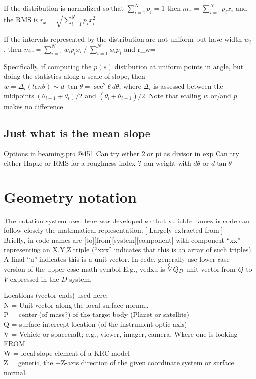 \documentclass{article}
\begin{document}
If the distribution is normalized so that $\sum_{i=1}^N p_i =1$ 
 then  $ m_x=\sum_{i=1}^N p_i x_i $
 and the RMS is $ r_x=\sqrt{ \sum_{i=1}^N p_i x^2_i }$

\vspace{4.mm}

If the intervals represented by the distribution are not uniform but have width $w_i$, 
\qii then $ m_w=\sum_{i=1}^N w_ip_ix_i \ \big/ \ \sum_{i=1}^N w_ip_i$ and 
\qb r_w= \qe


Specifically, if computing the $p(s)$ distibution at uniform points in angle,
but doing the statistics along a scale of slope, then $w= \Delta_i (tan \theta)
\sim d \ \tan \theta = \sec ^2 \theta \ d \theta $, where $\Delta_i$ is assessed
between the midpoints $(\theta_{i-1}+ \theta_i )/2 $ and $(\theta_i +
\theta_{i+1} )/2 $. Note that scaling $w$ or/and $p$ makes no difference.

\subsection{Just what is the mean slope}
Options in beaming.pro @451
\qi Can try either 2 or pi as divisor in exp
\qi Can try either Hapke or RMS for a roughness index
\qi ? can weight with $d \theta$ or  $d \tan \theta$

\section{Geometry notation \label{geom}}

 The notation system used here was developed so that variable names in code can
 follow closely the mathmatical representation.  [ Largely extracted from  ]  
\\ Briefly, in code names are [to][from][system][component] with component ``xx'' representing an X,Y,Z triple (``xxx'' indicates that this is an array of such triples)
\qi A final ``u'' indicates this is a unit vector. 
\qi In code, generally use lower-case version of the upper-case math symbol
\qi E.g., vqdxu is $\overleftarrow{VQ_D}$ unit vector from $Q$ to $V$ expressed in the $D$ system.

\vspace{2.mm}
Locations (vector ends) used here:
\\ N = Unit vector along the local surface normal.
\\ P = center (of mass?) of the target body (Planet or satellite)
\\ Q = surface intercept location (of the instrument optic axis)
\\ V = Vehicle or spacecraft; e.g., viewer, imager, camera. Where one is looking FROM
\\ W = local slope element of a KRC model
\\ Z = generic, the +Z-axis direction of the given coordinate system or surface normal.
 
\end{document}
